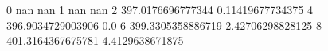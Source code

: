 0 nan nan
1 nan nan
2 397.0176696777344 0.11419677734375
4 396.9034729003906 0.0
6 399.3305358886719 2.42706298828125
8 401.3164367675781 4.4129638671875
